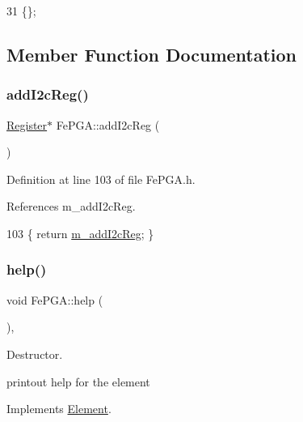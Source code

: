 \begin{DoxyCode}
31 \{\}; 
\end{DoxyCode}


\subsection{Member Function Documentation}
\mbox{\label{classFePGA_a64feabdb09e65b1b4b1376a4da713570}} 
\subsubsection{\texorpdfstring{add\+I2c\+Reg()}{addI2cReg()}}
{\footnotesize\ttfamily \hyperlink{classRegister}{Register}$\ast$ Fe\+P\+G\+A\+::add\+I2c\+Reg (\begin{DoxyParamCaption}{ }\end{DoxyParamCaption})\hspace{0.3cm}{\ttfamily [inline]}}



Definition at line 103 of file Fe\+P\+G\+A.\+h.



References m\+\_\+add\+I2c\+Reg.


\begin{DoxyCode}
103 \{ \textcolor{keywordflow}{return} \hyperlink{classFePGA_af3ef3467ba803e6d3b970ea8982d6246}{m\_addI2cReg};    \}
\end{DoxyCode}
\mbox{\label{classFePGA_ae6425fbad1a8db57025efaf387a6f41b}} 
\subsubsection{\texorpdfstring{help()}{help()}}
{\footnotesize\ttfamily void Fe\+P\+G\+A\+::help (\begin{DoxyParamCaption}{ }\end{DoxyParamCaption})\hspace{0.3cm}{\ttfamily [inline]}, {\ttfamily [virtual]}}



Destructor. 

printout help for the element 

Implements \hyperlink{classElement_a32c0de27acb08e17251cef88c3e9303a}{Element}.



